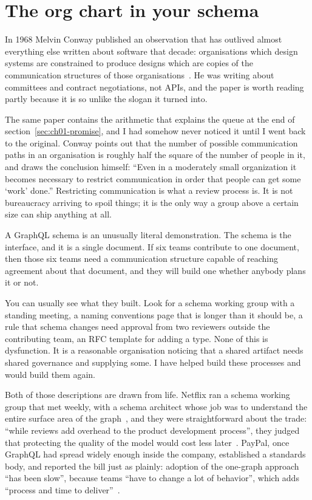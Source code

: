 \section{The org chart in your schema}
\label{sec:ch01-org-chart}

%
In 1968 Melvin Conway published an observation that has outlived almost
everything else written about software that decade: organisations which design
systems are constrained to produce designs which are copies of the
communication structures of those organisations~\autocite{conway1968committees}.
He was writing about committees and contract negotiations, not APIs, and the
paper is worth reading partly because it is so unlike the slogan it turned
into.

The same paper contains the arithmetic that explains the queue at the end of
section~\ref{sec:ch01-promise}, and I had somehow never noticed it until I went
back to the original. Conway points out that the number of possible
communication paths in an organisation is roughly half the square of the number
of people in it, and draws the conclusion himself: \enquote{Even in a moderately
small organization it becomes necessary to restrict communication in order that
people can get some `work' done.} Restricting communication is what a review
process is. It is not bureaucracy arriving to spoil things; it is the only way a
group above a certain size can ship anything at all.

A GraphQL schema is an unusually literal demonstration. The schema is the
interface, and it is a single document. If six teams contribute to one
document, then those six teams need a communication structure capable of
reaching agreement about that document, and they will build one whether anybody
plans it or not.

You can usually see what they built. Look for a schema working group with a
standing meeting, a naming conventions page that is longer than it should be, a
rule that schema changes need approval from two reviewers outside the
contributing team, an RFC template for adding a type. None of this is
dysfunction. It is a reasonable organisation noticing that a shared artifact
needs shared governance and supplying some. I have helped build these processes
and would build them again.

Both of those descriptions are drawn from life. Netflix ran a schema working
group that met weekly, with a schema architect whose job was to understand the
entire surface area of the graph~\autocite{shin2020netflixtalk}, and they were
straightforward about the trade: \enquote{while reviews add overhead to the
product development process}, they judged that protecting the quality of the
model would cost less later~\autocite{shikhare2020netflix2}. PayPal, once
GraphQL had spread widely enough inside the company, established a standards
body, and reported the bill just as plainly: adoption of the one-graph approach
\enquote{has been slow}, because teams \enquote{have to change a lot of
behavior}, which adds \enquote{process and time to
deliver}~\autocite{kapoor2021paypal}.

